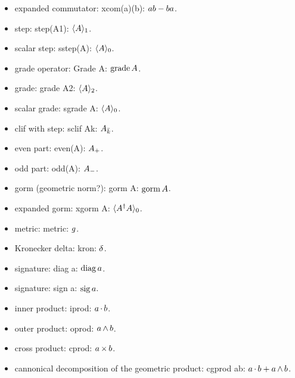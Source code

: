 \begin{multicols}{2}
\begin{itemize}
\item expanded commutator: xcom(a)(b): ${a}{b} - {b}{a}$.
\item step: step(A1): $\langle{A}\rangle_{1}$.
\item scalar step: sstep(A): $\langle{A}\rangle_{0}$.
\item grade operator: Grade A: $\operatorname{grade} A$.
\item grade: grade A2: $\langle{A}\rangle_{2}$.
\item scalar grade: sgrade A: $\langle{A}\rangle_{0}$.
\item clif with step: sclif Ak: ${A}_{\bar{k}}$.
\item even part: even(A): ${A}_{+}$.
\item odd part: odd(A): ${A}_{-}$.
\item gorm (geometric norm?): gorm A: $\operatorname{gorm} A$.
\item expanded gorm: xgorm A: $\langle{{A}^{\dagger}{A}}\rangle_{0}$.
\item metric: metric: $g$.
\item Kronecker delta: kron: $\delta$.
\item signature: diag a: $\operatorname{diag} a$.
\item signature: sign a: $\operatorname{sig} a$.
\item inner product: iprod: $a\operatorname{\cdot} b$.
\item outer product: oprod: $a\operatorname{\wedge} b$.
\item cross product: cprod: $a\operatorname{\times} b$.
\item cannonical decomposition of the geometric product: cgprod ab: ${a}\operatorname{\cdot}{b} + {a}\operatorname{\wedge}{b}$.
\end{itemize}



\end{multicols}
